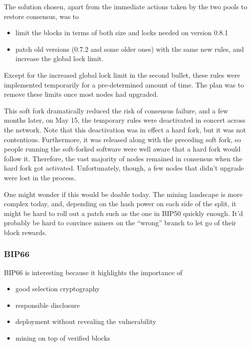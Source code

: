 The solution chosen, apart from the immediate actions taken by the two
pools to restore consensus, was to

\begin{itemize}
\item
  limit the blocks in terms of both size and locks needed on version
  0.8.1
\item
  patch old versions (0.7.2 and some older ones) with the same new
  rules, and increase the global lock limit.
\end{itemize}

Except for the increased global lock limit in the second bullet, these
rules were implemented temporarily for a pre-determined amount of time.
The plan was to remove these limits once most nodes had upgraded.

This soft fork dramatically reduced the risk of consensus failure, and a
few months later, on May 15, the temporary rules were deactivated in
concert across the network. Note that this deactivation was in effect a
hard fork, but it was not contentious. Furthermore, it was released
along with the preceding soft fork, so people running the soft-forked
software were well aware that a hard fork would follow it. Therefore,
the vast majority of nodes remained in consensus when the hard fork got
activated. Unfortunately, though, a few nodes that didn't upgrade were
lost in the process.

One might wonder if this would be doable today. The mining landscape is
more complex today, and, depending on the hash power on each side of the
split, it might be hard to roll out a patch such as the one in BIP50
quickly enough. It'd probably be hard to convince miners on the
``wrong'' branch to let go of their block rewards.

\hypertarget{bip66-splits}{%
\subsubsection{BIP66}\label{bip66-splits}}

BIP66 is interesting because it highlights the importance of

\begin{itemize}
\item
  good selection cryptography
\item
  responsible disclosure
\item
  deployment without revealing the vulnerability
\item
  mining on top of verified blocks
\end{itemize}

